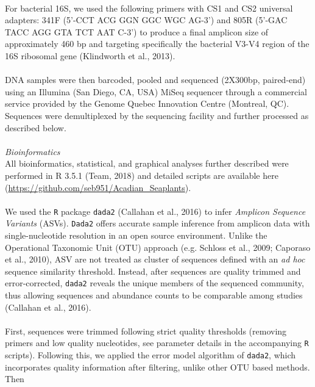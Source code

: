 \documentclass[11pt,]{article}
\begin{document}
\hspace*{0.333em}\\
For bacterial 16S, we used the following primers with CS1 and CS2
universal adapters: 341F (5'-CCT ACG GGN GGC WGC AG-3') and 805R (5'-GAC
TACC AGG GTA TCT AAT C-3') to produce a final amplicon size of
approximately 460 bp and targeting specifically the bacterial V3-V4
region of the 16S ribosomal gene (Klindworth et al., 2013).\\
\hspace*{0.333em}\\
DNA samples were then barcoded, pooled and sequenced (2X300bp,
paired-end) using an Illumina (San Diego, CA, USA) MiSeq sequencer
through a commercial service provided by the Genome Quebec Innovation
Centre (Montreal, QC). Sequences were demultiplexed by the sequencing
facility and further processed as described below.\\
\hspace*{0.333em}\\
\emph{Bioinformatics}\\
All bioinformatics, statistical, and graphical analyses further
described were performed in R 3.5.1 (Team, 2018) and detailed scripts
are available here
(\url{https://github.com/seb951/Acadian_Seaplants}).\\
\hspace*{0.333em}\\
We used the \texttt{R} package \texttt{dada2} (Callahan et al., 2016) to
infer \emph{Amplicon Sequence Variants} (ASVs). \texttt{Dada2} offers
accurate sample inference from amplicon data with single-nucleotide
resolution in an open source environment. Unlike the Operational
Taxonomic Unit (OTU) approach (e.g. Schloss et al., 2009; Caporaso et
al., 2010), ASV are not treated as cluster of sequences defined with an
\emph{ad hoc} sequence similarity threshold. Instead, after sequences
are quality trimmed and error-corrected, \texttt{dada2} reveals the
unique members of the sequenced community, thus allowing sequences and
abundance counts to be comparable among studies (Callahan et al.,
2016).\\
\hspace*{0.333em}\\
First, sequences were trimmed following strict quality thresholds
(removing primers and low quality nucleotides, see parameter details in
the accompanying \texttt{R} scripts). Following this, we applied the
error model algorithm of \texttt{dada2}, which incorporates quality
information after filtering, unlike other OTU based methods. Then
\end{document}
